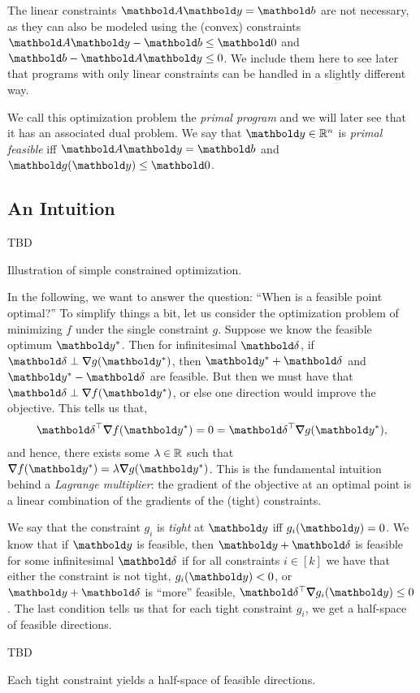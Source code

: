 \begin{rmk}
The linear constraints $\mA\vy = \vb$ are not necessary, as they can also be modeled using the (convex) constraints $\mA\vy - \vb \leq \vZero$ and $\vb - \mA\vy \leq 0$. We include them here to see later that programs with only linear constraints can be handled in a slightly different way.
\end{rmk}

We call this optimization problem the \emph{primal program} and we will later see that it has an associated dual problem. We say that $\vy \in \R^n$ is \emph{primal feasible} iff $\mA\vy = \vb$ and $\vg(\vy) \leq \vZero$.

\subsection{An Intuition}

\begin{marginfigure}
TBD
\caption{Illustration of simple constrained optimization.}
\end{marginfigure}
In the following, we want to answer the question: ``When is a feasible point optimal?'' To simplify things a bit, let us consider the optimization problem of minimizing $f$ under the single constraint $g$. Suppose we know the feasible optimum $\s{\vy}$. Then for infinitesimal $\vdelta$, if $\vdelta \perp \grad g(\s{\vy})$, then $\s{\vy} + \vdelta$ and $\s{\vy} - \vdelta$ are feasible. But then we must have that $\vdelta \perp \grad f(\s{\vy})$, or else one direction would improve the objective. This tells us that, \begin{align*}
    \trans{\vdelta}\grad f(\s{\vy}) = 0 = \trans{\vdelta}\grad g(\s{\vy}),
\end{align*} and hence, there exists some $\lambda \in \mathbb{R}$ such that $\grad f(\s{\vy}) = \lambda \grad g(\s{\vy})$. This is the fundamental intuition behind a \emph{Lagrange multiplier}: the gradient of the objective at an optimal point is a linear combination of the gradients of the (tight) constraints.

We say that the constraint $g_i$ is \emph{tight} at $\vy$ iff $g_i(\vy) = 0$. We know that if $\vy$ is feasible, then $\vy + \vdelta$ is feasible for some infinitesimal $\vdelta$ if for all constraints $i \in [k]$ we have that either the constraint is not tight, $g_i(\vy) < 0$, or $\vy + \vdelta$ is ``more'' feasible, $\trans{\vdelta} \grad g_i(\vy) \leq 0$. The last condition tells us that for each tight constraint $g_i$, we get a half-space of feasible directions.
\begin{marginfigure}
TBD
\caption{Each tight constraint yields a half-space of feasible directions.}
\end{marginfigure}

